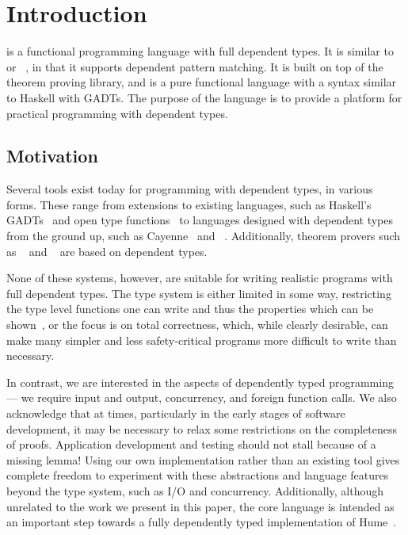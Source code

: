 \section{Introduction}

\Idris{} is a functional programming language with full dependent
types. It is similar to \Epigram~\cite{view-left} or
\Agda{}~\cite{ulf-thesis}, in that it supports dependent pattern
matching. It is built on top of the \Ivor{}~\cite{ivor} theorem
proving library, and is a pure functional language with a syntax
similar to Haskell with GADTs.  The purpose of the language is to
provide a platform for practical programming with dependent types.

\subsection{Motivation}

Several tools exist today for programming with dependent types, in
various forms. These range from extensions to existing languages, such
as Haskell's GADTs~\cite{gadts} and open type
functions~\cite{opentype-haskell} to languages designed with dependent
types from the ground up, such as Cayenne~\cite{cayenne-icfp} and
\Epigram{}~\cite{view-left}. Additionally, theorem provers such as
\Agda{}~\cite{ulf-thesis} and \Coq{}~\cite{coq-manual} are based on
dependent types.

None of these systems, however, are suitable for writing realistic
programs with full dependent types. The type system is either limited
in some way, restricting the type level functions one can
write and thus the properties which can be
shown~\cite{lightweight-dtp}, or the focus is on total correctness,
which, while clearly desirable, can make many simpler and less
safety-critical programs more difficult to write than necessary.

In contrast, we are interested in the  aspects of
dependently typed programming --- we require input and output,
concurrency, and foreign function calls. We also acknowledge that at
times, particularly in the early stages of software development, it
may be necessary to relax some restrictions on the completeness of
proofs. Application development and testing should not stall because
of a missing lemma!  Using our own implementation rather than an
existing tool gives complete freedom to experiment with these
abstractions and language features beyond the type system, such as I/O
and concurrency. Additionally, although unrelated to the work we
present in this paper, the core language is intended as an important
step towards a fully dependently typed implementation of
Hume~\cite{Hume-GPCE}.

